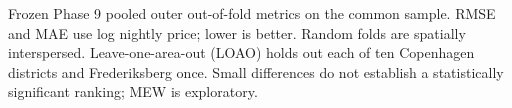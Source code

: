 \begin{landscape}
\begin{table}[p]
\begin{threeparttable}
\begin{tabular}{>{\raggedright\arraybackslash}p{4.2cm}>{\raggedright\arraybackslash}p{2.3cm}crrrr}
\bottomrule
\end{tabular}
\begin{tablenotes}[flushleft]\footnotesize
\item Frozen Phase 9 pooled outer out-of-fold metrics on the common sample. RMSE and MAE use log nightly price; lower is better. Random folds are spatially interspersed. Leave-one-area-out (LOAO) holds out each of ten Copenhagen districts and Frederiksberg once. Small differences do not establish a statistically significant ranking; MEW is exploratory.
\end{tablenotes}
\end{threeparttable}
\end{table}
\end{landscape}

